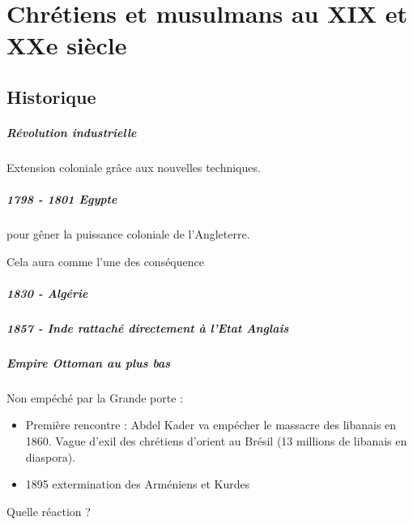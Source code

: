 \chapter{Chrétiens et musulmans au XIX et XXe siècle}


\section{Historique}

\paragraph{Révolution industrielle}
Extension coloniale grâce aux nouvelles techniques.


\paragraph{1798 - 1801 Egypte} pour gêner la puissance coloniale de l'Angleterre.

Cela aura comme l'une des conséquence 

\paragraph{1830 - Algérie}

\paragraph{1857 - Inde rattaché directement à l'Etat Anglais}


\paragraph{Empire Ottoman au plus bas}

Non empéché par la Grande porte : 
\begin{itemize}
    \item Première rencontre : Abdel Kader va empécher le massacre des libanais en 1860. Vague d'exil des chrétiens d'orient au Brésil (13 millions de libanais en diaspora).
    \item 1895 extermination des Arméniens et Kurdes
\end{itemize}

\begin{Synthesis}
Quelle réaction ? 
\end{Synthesis}


